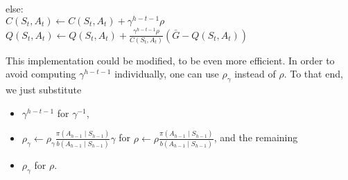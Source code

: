 \begin{solution}
\begin{tcolorbox}[title = {Off-policy MC control, for estimating $\pi \approx \pi_\ast$, using \eqref{eq:5.10'}}]
    \hspace*{0.5cm} \hspace*{0.5cm} \hspace*{0.5cm} else: \\
    \hspace*{0.5cm} \hspace*{0.5cm} \hspace*{0.5cm} \hspace*{0.5cm} $C(S_t, A_t) \leftarrow C(S_t, A_t) + \gamma^{h-t-1} \rho$ \\
    \hspace*{0.5cm} \hspace*{0.5cm} \hspace*{0.5cm} \hspace*{0.5cm} $Q(S_t, A_t) \leftarrow Q(S_t, A_t) + \frac{\gamma^{h-t-1} \rho}{C(S_t, A_t)} (\bar G - Q(S_t, A_t))$

\end{tcolorbox}

This implementation could be modified, to be even more efficient.
In order to avoid computing $\gamma^{h-t-1}$ individually, one can use $\rho_\gamma$ instead of $\rho$.
To that end, we just substitute

\begin{itemize}
    \item $\gamma^{h-t-1}$ for $\gamma^{-1}$,
    \item $\rho_\gamma \leftarrow \rho_\gamma \frac{\pi(A_{h-1} \mid S_{h-1})}{b(A_{h-1} \mid S_{h-1})} \gamma$ for $\rho \leftarrow \rho \frac{\pi(A_{h-1} \mid S_{h-1})}{b(A_{h-1} \mid S_{h-1})}$, and the remaining
    \item $\rho_\gamma$ for $\rho$.
\end{itemize}

\end{solution}

